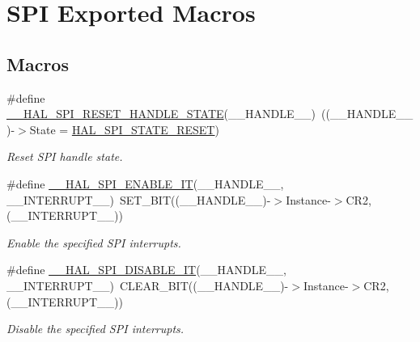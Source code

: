\hypertarget{group___s_p_i___exported___macros}{}\section{S\+PI Exported Macros}
\label{group___s_p_i___exported___macros}
\subsection*{Macros}
\begin{DoxyCompactItemize}
\item 
\#define \mbox{\hyperlink{group___s_p_i___exported___macros_ga0d846f9517715960873e854b4a0790b0}{\+\_\+\+\_\+\+H\+A\+L\+\_\+\+S\+P\+I\+\_\+\+R\+E\+S\+E\+T\+\_\+\+H\+A\+N\+D\+L\+E\+\_\+\+S\+T\+A\+TE}}(\+\_\+\+\_\+\+H\+A\+N\+D\+L\+E\+\_\+\+\_\+)~((\+\_\+\+\_\+\+H\+A\+N\+D\+L\+E\+\_\+\+\_\+)-\/$>$State = \mbox{\hyperlink{group___s_p_i___exported___types_gga8891cb64e76198a860172d94c638c9b4adbc218df2c9841b561282b40b3ded69d}{H\+A\+L\+\_\+\+S\+P\+I\+\_\+\+S\+T\+A\+T\+E\+\_\+\+R\+E\+S\+ET}})
\begin{DoxyCompactList}\small\item\em Reset S\+PI handle state. \end{DoxyCompactList}\item 
\#define \mbox{\hyperlink{group___s_p_i___exported___macros_ga76064652f6f56d8868720b5541e854f5}{\+\_\+\+\_\+\+H\+A\+L\+\_\+\+S\+P\+I\+\_\+\+E\+N\+A\+B\+L\+E\+\_\+\+IT}}(\+\_\+\+\_\+\+H\+A\+N\+D\+L\+E\+\_\+\+\_\+,  \+\_\+\+\_\+\+I\+N\+T\+E\+R\+R\+U\+P\+T\+\_\+\+\_\+)~S\+E\+T\+\_\+\+B\+IT((\+\_\+\+\_\+\+H\+A\+N\+D\+L\+E\+\_\+\+\_\+)-\/$>$Instance-\/$>$C\+R2, (\+\_\+\+\_\+\+I\+N\+T\+E\+R\+R\+U\+P\+T\+\_\+\+\_\+))
\begin{DoxyCompactList}\small\item\em Enable the specified S\+PI interrupts. \end{DoxyCompactList}\item 
\#define \mbox{\hyperlink{group___s_p_i___exported___macros_ga47fa7321c5755bfbff1a7229fbe5b21c}{\+\_\+\+\_\+\+H\+A\+L\+\_\+\+S\+P\+I\+\_\+\+D\+I\+S\+A\+B\+L\+E\+\_\+\+IT}}(\+\_\+\+\_\+\+H\+A\+N\+D\+L\+E\+\_\+\+\_\+,  \+\_\+\+\_\+\+I\+N\+T\+E\+R\+R\+U\+P\+T\+\_\+\+\_\+)~C\+L\+E\+A\+R\+\_\+\+B\+IT((\+\_\+\+\_\+\+H\+A\+N\+D\+L\+E\+\_\+\+\_\+)-\/$>$Instance-\/$>$C\+R2, (\+\_\+\+\_\+\+I\+N\+T\+E\+R\+R\+U\+P\+T\+\_\+\+\_\+))
\begin{DoxyCompactList}\small\item\em Disable the specified S\+PI interrupts. \end{DoxyCompactList}\item 

\end{DoxyCompactItemize}
